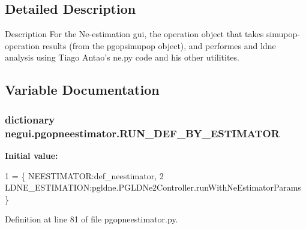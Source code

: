 \subsection{Detailed Description}
\begin{DoxyVerb}Description
For the Ne-estimation gui, the operation object
that takes simupop-operation results (from the pgopsimupop
object), and performes and ldne analysis using Tiago Antao's
ne.py code and his other utilitites.
\end{DoxyVerb}
 

\subsection{Variable Documentation}
\subsubsection[{\texorpdfstring{R\+U\+N\+\_\+\+D\+E\+F\+\_\+\+B\+Y\+\_\+\+E\+S\+T\+I\+M\+A\+T\+OR}{RUN_DEF_BY_ESTIMATOR}}]{\setlength{\rightskip}{0pt plus 5cm}dictionary negui.\+pgopneestimator.\+R\+U\+N\+\_\+\+D\+E\+F\+\_\+\+B\+Y\+\_\+\+E\+S\+T\+I\+M\+A\+T\+OR}\hypertarget{namespacenegui_1_1pgopneestimator_a5846200d2db508e6882639effc91f7e7}{}\label{namespacenegui_1_1pgopneestimator_a5846200d2db508e6882639effc91f7e7}
{\bfseries Initial value\+:}
\begin{DoxyCode}
1 = \{ NEESTIMATOR:def\_neestimator,
2                         LDNE\_ESTIMATION:pgldne.PGLDNe2Controller.runWithNeEstimatorParams \}
\end{DoxyCode}


Definition at line 81 of file pgopneestimator.\+py.

